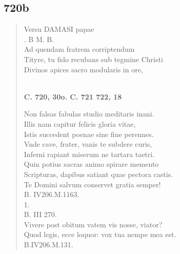 \documentclass[11pt, a4paper]{report}
\begin{document}
            \subsection*{720b}
      \begin{verse}
      Versu DAMASI papae \\ . B M. B. \\ Ad quendam fratrem corriptendum \\ Tityre, tu fido recubans sub tegmine Christi \\ Divinos apices sacro modularis in ore, \\ 
        ﻿\pagebreak 
     \marginpar{[206]} \begin{center} \textbf{C. 720, 30o. C. 721 722, 18} \end{center}Non falsas fabulas studio meditaris inani. \\ Illis nam capitur felicis gloria vitae, \\ Istis succedent poenae sine fine perennes. \\ Vnde cave, frater, vanis te subdere curis, \\ Inferni rapiant miserum ne tartara taetri. \\ Quin potius sacras animo spirare memento \\ Scripturas, dapibus satiant quae pectora castis. \\ Te Domini salvum conservet gratia semper! \\ B. IV206.M.1163. \\ 1. \\ B. III 270. \\ Vivere post obitum vatem vis nosse, viator? \\ Quod legis, ecce loquor: vox tua nempe mea est. \\ B.IV206.M.131. \\ 
      \end{verse}
  
\end{document}
